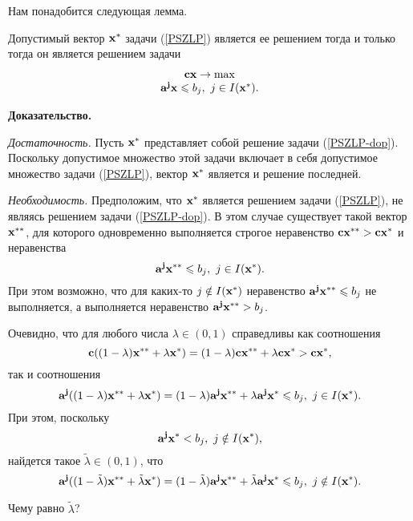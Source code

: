     Нам понадобится следующая лемма. 
\begin{lem}
  \label{vspom-lemma}
    Допустимый вектор $\mathbf{x}^{*}$  задачи
    (\ref{PSZLP}) является ее решением тогда и только тогда он является
    решением задачи
    \begin{equation}\label{PSZLP-dop}
\begin{array}{c}
    \mathbf{c}\mathbf{x}  \to  \max\\
    \mathbf{a^{j}}\mathbf{x}  \leqslant b_j, \ j\in I(\mathbf{x^{*}}). \\
\end{array}
\end{equation}
\end{lem}
    \textbf{Доказательство.}

    \emph{Достаточность.} Пусть $\mathbf{x}^{*}$ представляет собой
    решение задачи (\ref{PSZLP-dop}). Поскольку допустимое множество
    этой задачи включает в себя допустимое множество задачи
    (\ref{PSZLP}), вектор $\mathbf{x}^{*}$ является и решение последней.

    \emph{Необходимость.} Предположим, что $\mathbf{x}^{*}$ является
    решением задачи (\ref{PSZLP}), не являясь решением задачи (\ref{PSZLP-dop}).
    В этом случае существует такой вектор
    $\mathbf{x^{**}}$, для которого одновременно выполняется строгое неравенство
    $\mathbf{c}\mathbf{x^{**}}>\mathbf{c}\mathbf{x^{*}}$ и неравенства
\[
    \mathbf{a^{j}}\mathbf{x^{**}}\leqslant b_j, \ j\in I(\mathbf{x^{*}}).
\]
    При этом возможно, что для каких-то $j\notin I(\mathbf{x^{*}})$
    неравенство $\mathbf{a^{j}}\mathbf{x^{**}}\leqslant b_j$ не выполняется,
    а выполняется неравенство $\mathbf{a^{j}}\mathbf{x^{**}}>b_j$.

    Очевидно, что для любого числа $\lambda\in(0,1)$ справедливы как
    соотношения
\[
    \mathbf{c}((1-\lambda)\mathbf{x^{**}}+\lambda\mathbf{x^{*}})=
    (1-\lambda)\mathbf{c}\mathbf{x^{**}}+\lambda\mathbf{c}\mathbf{x^{*}}>\mathbf{c}\mathbf{x^{*}},
\]
    так и соотношения
\[
    \mathbf{a^{j}}((1-\lambda)\mathbf{x^{**}}+\lambda\mathbf{x^{*}})=
    (1-\lambda)\mathbf{a^{j}}\mathbf{x^{**}}+\lambda\mathbf{a^{j}}\mathbf{x^{*}}\leqslant b_j, \ j\in I(\mathbf{x^{*}}).
\]
    При этом, поскольку
\[
    \mathbf{a^{j}}\mathbf{x^{*}}<b_j, \ j\notin I(\mathbf{x^{*}}),
\]
    найдется такое $\tilde{\lambda}\in(0,1)$, что
\[
    \mathbf{a^{j}}((1-\tilde{\lambda})\mathbf{x^{**}}+\tilde{\lambda}\mathbf{x^{*}})=
    (1-\tilde{\lambda})\mathbf{a^{j}}\mathbf{x^{**}}+\tilde{\lambda}\mathbf{a^{j}}\mathbf{x^{*}}
    \leqslant b_j, \ j\notin I(\mathbf{x^{*}}).
\]

\begin{exer}
    Чему равно $\tilde{\lambda}$?
\end{exer}

